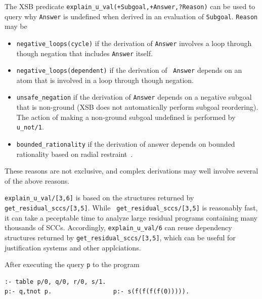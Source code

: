 \begin{description}
  
%
The XSB predicate
%
{\tt explain\_u\_val(+Subgoal,+Answer,?Reason)}
\noindent
can be used to query why {\tt Answer} is undefined when derived in an
evaluation of {\tt Subgoal}.  {\tt Reason} may be
\begin{itemize}
\item {\tt negative\_loops(cycle)} if the derivation of {\tt Answer} involves a
  loop through though negation that includes {\tt Answer} itself.
%
\item {\tt negative\_loops(dependent)} if the derivation of {\tt
  Answer} depends on an atom that is involved in a loop through though
  negation.
%
\item {\tt unsafe\_negation} if the derivation of {\tt Answer} depends
  on a negative subgoal that is non-ground (XSB does not automatically
  perform subgoal reordering).  The action of making a non-ground
  subgoal undefined is performed by {\tt u\_not/1}.
%
\item {\tt bounded\_rationality} if the derivation of answer depends
  on bounded rationality based on radial restraint~\cite{GroS13}.
\end{itemize}
%
These reasons are not exclusive, and complex derivations may well
involve several of the above reasons.

{\tt explain\_u\_val/[3,6]} is based on the structures returned by
{\tt get\_residual\_sccs/[3,5]}.  While {\tt
  get\_residual\_sccs/[3,5]} is reasonably fast, it can take a
peceptable time to analyze large residual programs containing many
thousands of SCCs.  Accordingly, {\tt explain\_u\_val/6} can reuse
dependency structures returned by {\tt get\_residual\_sccs/[3,5]},
which can be useful for justification systems and other applciations.

\begin{example} \rm
After executing the query {\tt p} to the program
%
\begin{verbatim}
:- table p/0, q/0, r/0, s/1.
p:- q,tnot p.                 p:- s(f(f(f(f(0))))).


\end{verbatim}
\end{example}
\end{description}
